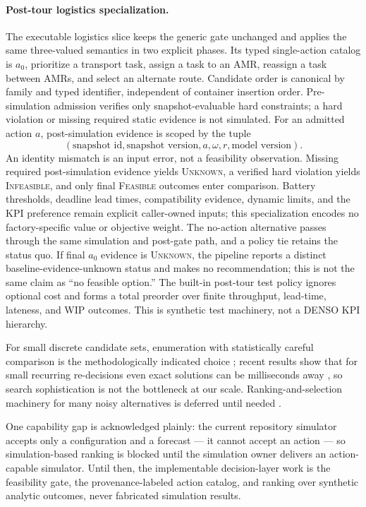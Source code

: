 \documentclass[11pt,a4paper]{article}
\begin{document}
\paragraph{Post-tour logistics specialization.}
The executable logistics slice keeps the generic gate unchanged and applies
the same three-valued semantics in two explicit phases. Its typed
single-action catalog is $a_0$, prioritize a transport task, assign a task to
an AMR, reassign a task between AMRs, and select an alternate route. Candidate
order is canonical by family and typed identifier, independent of container
insertion order. Pre-simulation admission verifies only snapshot-evaluable
hard constraints; a hard violation or missing required static evidence is not
simulated. For an admitted action $a$, post-simulation evidence is scoped by
the tuple
\[
(\text{snapshot id},\text{snapshot version},a,\omega,r,
  \text{model version}).
\]
An identity mismatch is an input error, not a feasibility observation.
Missing required post-simulation evidence yields \textsc{Unknown}, a verified
hard violation yields \textsc{Infeasible}, and only final
\textsc{Feasible} outcomes enter comparison. Battery thresholds, deadline
lead times, compatibility evidence, dynamic limits, and the KPI preference
remain explicit caller-owned inputs; this specialization encodes no
factory-specific value or objective weight. The no-action alternative passes
through the same simulation and post-gate path, and a policy tie retains the
status quo. If final $a_0$ evidence is \textsc{Unknown}, the pipeline reports
a distinct baseline-evidence-unknown status and makes no recommendation; this
is not the same claim as ``no feasible option.'' The built-in post-tour test
policy ignores optional cost and forms a total preorder over finite
throughput, lead-time, lateness, and WIP outcomes. This is synthetic test
machinery, not a DENSO KPI hierarchy.

For small discrete candidate sets, enumeration with statistically careful
comparison is the methodologically indicated choice
\cite{amaran2016simulation,kleywegt2002saa}; recent results show that for
small recurring re-decisions even exact solutions can be milliseconds away
\cite{adamo2024realtime}, so search sophistication is not the bottleneck at
our scale. Ranking-and-selection machinery for many noisy alternatives is
deferred until needed \cite{wang2024sequential}.

One capability gap is acknowledged plainly: the current repository simulator
accepts only a configuration and a forecast --- it cannot accept an action
--- so simulation-based ranking is blocked until the simulation owner
delivers an action-capable simulator. Until then, the implementable
decision-layer work is the feasibility gate, the provenance-labeled action
catalog, and ranking over synthetic analytic outcomes, never fabricated
simulation results.
\end{document}
